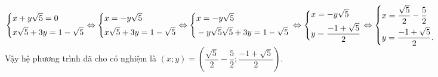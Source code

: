 \begin{vd}
{\begin{enumEX}{1}
			\item $\left\{\begin{aligned}&x+y\sqrt{5}=0\\&x\sqrt{5}+3y=1-\sqrt{5}\end{aligned}\right. \Leftrightarrow \left\{\begin{aligned}&x=-y\sqrt{5}\\& x\sqrt{5}+3y=1-\sqrt{5}\end{aligned}\right. \Leftrightarrow \left\{\begin{aligned}&x=-y\sqrt{5}\\ &-y\sqrt{5}\sqrt{5}+3y=1-\sqrt{5} \end{aligned}\right. \\ \Leftrightarrow \left\{\begin{aligned}&x=-y\sqrt{5}\\&y=\dfrac{-1+\sqrt{5}}{2}\end{aligned}\right. \Leftrightarrow \left\{\begin{aligned}&x=\dfrac{\sqrt{5}}{2} -\dfrac{5}{2}\\&y=\dfrac{-1+\sqrt{5}}{2}.\end{aligned}\right.$\\ Vậy hệ phương trình đã cho có nghiệm là $(x;y)=\left(\dfrac{\sqrt{5}}{2}-\dfrac{5}{2}; \dfrac{-1+\sqrt{5}}{2}\right).$
		\end{enumEX}
		
	}
\end{vd}

